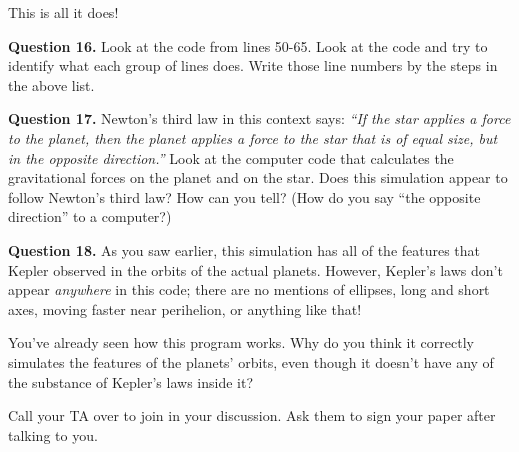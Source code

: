 \documentclass[11pt]{article}
\begin{document}
This is all it does! 

\vspace{1em}

\textbf{Question 16.} Look at the code from lines 50-65. Look at the code and try to identify what each group of lines does. Write those line numbers by the steps in the above list. 

\textbf{Question 17.} Newton's third law in this context says: {\it ``If the star applies a force to the planet, then the planet applies a force to the star that is of equal size, but in the opposite direction.''} Look at the
computer code that calculates the gravitational forces on the planet and on the star. Does this simulation appear to follow Newton's third law? How can you tell? (How do you say ``the opposite direction'' to a computer?)

\vspace{1.5in}


\textbf{Question 18.} As you saw earlier, this simulation has all of the features that Kepler observed in the orbits of the actual planets. However, Kepler's laws don't appear {\it anywhere} in this code; there are no mentions of ellipses, long and short axes, moving faster near perihelion, or anything like that!

You've already seen how this program works. Why do you think it correctly simulates the features of the planets' orbits, even though it doesn't have any of the substance of Kepler's laws inside it?

Call your TA over to join in your discussion. Ask them to sign your paper after talking to you.
\end{document}
